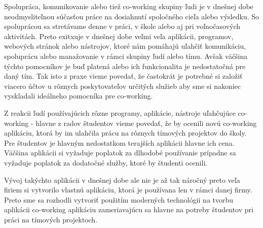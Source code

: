 \indent Spolupráca, komunikovanie alebo tiež co-working skupiny ľudi je v dnešnej dobe neodmysliteľnou súčasťou práce na dosiahnutí spoločného cieľa alebo výsledku. So spoluprácou sa stretávame denne v práci, v škole alebo aj pri voľnočasových aktivitách. Preto exitxuje v dnešnej dobe veľmi veľa aplikácii, programov, webových stránok alebo nástrojov, ktoré nám pomáhajú uľahčiť komunikáciu, spoluprácu alebo manažovanie v rámci skupiny ľudí alebo tímu. Avšak väčšina týchto pomocníkov je buď platená alebo ich funkcionalita je nedostatočná pre daný tím. Tak isto z praxe vieme povedať, že častokrát je potrebné si založiť viacero účtov u rôznych poskytovateľov určitých služieb aby sme si nakoniec vyskladali ideálneho pomocníka pre co-working.

\indent Z reakcii ľudí používajúcich rôzne programy, aplikácie, nástroje uľahčujúce co-working - hlavne z radov študentov vieme povedať, že by ocenili novú co-working aplikáciu, ktorá by im ulahčila prácu na rôznych tímových projektov do školy. Pre študentov je hlavným nedostatkom terajších aplikácii hlavne ich cena. Väčšina aplikácii si vyžaduje poplatok za dlhodobé používanie prípadne sa vyžaduje poplatok za dodatočné služby, ktoré by študenti ocenili. 

\indent Vývoj takýchto aplikácii v dnešnej dobe ale nie je až tak náročný preto veľa firiem si vytvorilo vlastnú aplikáciu, ktorá je používana len v rámci danej firmy. Preto sme sa rozhodli vytvoriť použitím moderných technológii na tvorbu aplikácii co-working aplikáciu zameriavajúcu sa hlavne na potreby študentov pri práci na tímových projektoch.  